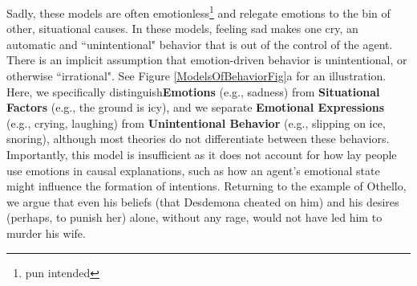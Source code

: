 \documentclass[10pt,letterpaper]{article}
\begin{document}

Sadly, these models are often emotionless\footnote{pun intended} and relegate emotions to the bin of other, situational causes. In these models, feeling sad makes one cry, an automatic and ``unintentional" behavior that is out of the control of the agent. There is an implicit assumption that emotion-driven behavior is unintentional, or otherwise ``irrational". See Figure \ref{ModelsOfBehaviorFig}a for an illustration. Here, we specifically distinguish\textbf{Emotions} (e.g., sadness) from \textbf{Situational Factors} (e.g., the ground is icy), and we separate \textbf{Emotional Expressions} (e.g., crying, laughing) from \textbf{Unintentional Behavior} (e.g., slipping on ice, snoring), although most theories do not differentiate between these behaviors. Importantly, this model is insufficient as it does not account for how lay people use emotions in causal explanations, such as how an agent's emotional state might influence the formation of intentions. Returning to the example of Othello, we argue that even his beliefs (that Desdemona cheated on him) and his desires (perhaps, to punish her) alone, without any rage, would not have led him to murder his wife. 
\end{document}
